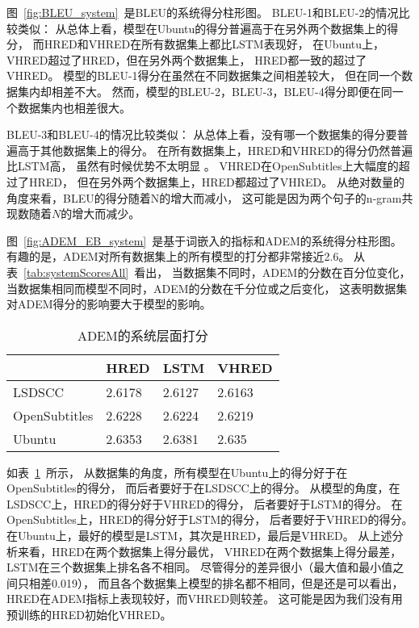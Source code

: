 
图~\ref{fig:BLEU_system}~是BLEU的系统得分柱形图。
BLEU-1和BLEU-2的情况比较类似：
从总体上看，模型在Ubuntu的得分普遍高于在另外两个数据集上的得分，
而HRED和VHRED在所有数据集上都比LSTM表现好，
在Ubuntu上，VHRED超过了HRED，但在另外两个数据集上，
HRED都一致的超过了VHRED。
模型的BLEU-1得分在虽然在不同数据集之间相差较大，
但在同一个数据集内却相差不大。
然而，模型的BLEU-2，BLEU-3，BLEU-4得分即便在同一个数据集内也相差很大。

BLEU-3和BLEU-4的情况比较类似：
从总体上看，没有哪一个数据集的得分要普遍高于其他数据集上的得分。
在所有数据集上，HRED和VHRED的得分仍然普遍比LSTM高，
虽然有时候优势不太明显 。
VHRED在OpenSubtitles上大幅度的超过了HRED，
但在另外两个数据集上，HRED都超过了VHRED。
从绝对数量的角度来看，BLEU的得分随着N的增大而减小，
这可能是因为两个句子的n-gram共现数随着$N$的增大而减少。


图~\ref{fig:ADEM_EB_system}~是基于词嵌入的指标和ADEM的系统得分柱形图。
有趣的是，ADEM对所有数据集上的所有模型的打分都非常接近2.6。
从表~\ref{tab:systemScoresAll}~看出，
当数据集不同时，ADEM的分数在百分位变化，
当数据集相同而模型不同时，ADEM的分数在千分位或之后变化，
这表明数据集对ADEM得分的影响要大于模型的影响。
\begin{table}[H]
    \centering
    \caption{ADEM的系统层面打分}
    \label{tab:ADEM_system}
    \begin{tabular}{llll}
        \toprule
        & HRED & LSTM & VHRED \\
        \midrule
        LSDSCC & 2.6178 & 2.6127 & 2.6163  \\
        OpenSubtitles & 2.6228 & 2.6224 & 2.6219 \\
        Ubuntu & 2.6353 & 2.6381 & 2.635 \\
        \bottomrule
    \end{tabular}
\end{table}
如表~\ref{tab:ADEM_system}~所示，
从数据集的角度，所有模型在Ubuntu上的得分好于在OpenSubtitles的得分，
而后者要好于在LSDSCC上的得分。
从模型的角度，在LSDSCC上，HRED的得分好于VHRED的得分，
后者要好于LSTM的得分。
在OpenSubtitles上，HRED的得分好于LSTM的得分，
后者要好于VHRED的得分。
在Ubuntu上，最好的模型是LSTM，其次是HRED，最后是VHRED。
从上述分析来看，HRED在两个数据集上得分最优，
VHRED在两个数据集上得分最差，
LSTM在三个数据集上排名各不相同。
尽管得分的差异很小（最大值和最小值之间只相差0.019），
而且各个数据集上模型的排名都不相同，但是还是可以看出，
HRED在ADEM指标上表现较好，而VHRED则较差。
这可能是因为我们没有用预训练的HRED初始化VHRED。

